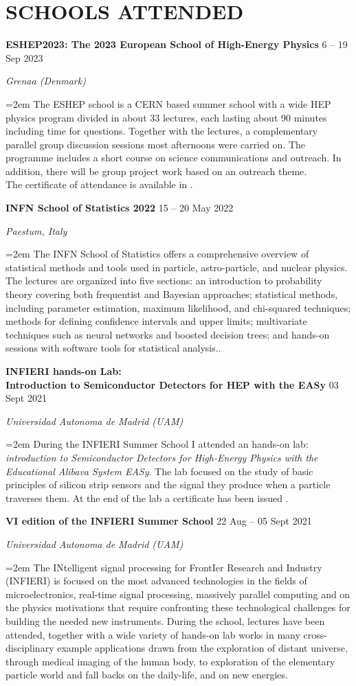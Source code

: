 \documentclass[fontsize=12pt]{article} %
\newcommand{\sepspace}{\vspace*{1em}}		%
\newcommand{\NewPart}[1]{\section*{\uppercase{#1}}}
\newcommand{\EducationEntry}[4]{
	\noindent \textbf{#1} \hfill      %
	{#2} \par  %
	\noindent \textit{#3} \par        %
	\noindent\hangindent=2em\hangafter=0 \small #4 %
	\normalsize \par}
\begin{document}
	\sepspace
	\NewPart{Schools attended}
	\EducationEntry{ESHEP2023: The 2023 European School of High-Energy Physics}{6 {--} 19 Sep 2023}{Grenaa (Denmark)}{The ESHEP school is a CERN based summer school with a wide HEP physics program divided in about 33 lectures, each lasting about 90 minutes including time for questions. Together with the lectures, a complementary parallel group discussion sessions most afternoons were carried on. The programme includes a short course on science communications and outreach. In addition, there will be group project work based on an outreach theme. \cite{eshep}\\The certificate of attendance is available in \cite{eshep_cert}.}
	\sepspace
	\EducationEntry{INFN School of Statistics 2022}{15 {--} 20 May 2022}{Paestum, Italy}{
		The INFN School of Statistics offers a comprehensive overview of statistical methods and tools used in particle, astro-particle, and nuclear physics. The lectures are organized into five sections: an introduction to probability theory covering both frequentist and Bayesian approaches; statistical methods, including parameter estimation, maximum likelihood, and chi-squared techniques; methods for defining confidence intervals and upper limits; multivariate techniques such as neural networks and boosted decision trees; and hands-on sessions with software tools for statistical analysis.. \cite{statschool}}
	\sepspace
	\EducationEntry{INFIERI hands-on Lab: \\ Introduction to Semiconductor Detectors for HEP with the EASy}{03 Sept 2021}{Universidad Autonoma de Madrid (UAM)}{During the INFIERI Summer School I attended an hands-on lab: \textit{introduction to Semiconductor Detectors for High-Energy Physics with the Educational Alibava System EASy}. The lab focused on the study of basic principles of silicon strip sensors and the signal they produce when a particle traverses them. At the end of the lab a certificate has been issued \cite{Easy_Certificate}.}
    \sepspace
	\EducationEntry{VI edition of the INFIERI Summer School}{ 22 Aug {--} 05 Sept 2021 }{Universidad Autonoma de Madrid (UAM)}{The INtelligent signal processing for FrontIer Research and Industry (INFIERI) is focused on the most advanced technologies in the fields of microelectronics, real-time signal processing, massively parallel computing and on the physics motivations that require confronting these technological challenges for building the needed new instruments. During the school, lectures have been attended, together with a wide variety of hands-on lab works in many cross-disciplinary example applications drawn from the exploration of distant universe, through medical imaging of the human body, to exploration of the elementary particle world and fall backs on the daily-life, and on new energies. \cite{INFIERI}}
\end{document}
